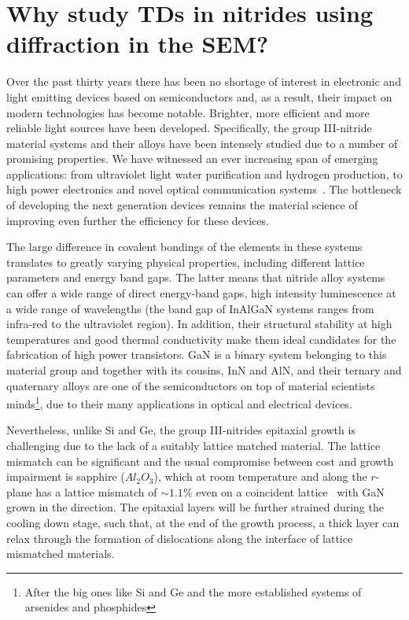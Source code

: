 \section{Why study TDs in nitrides using diffraction in the SEM?}
\label{sec:ECCITDmotivation}
Over the past thirty years there has been no shortage of interest in electronic and light emitting devices based on semiconductors and, as a result, their impact on modern technologies has become notable. Brighter, more efficient and more reliable light sources have been developed. Specifically, the group III-nitride material systems and their alloys have been intensely studied due to a number of promising properties. We have witnessed an ever increasing  span of emerging applications: from ultraviolet light water purification and hydrogen production, to high power electronics and novel optical communication systems~\cite{Kneissl10}. The bottleneck of developing the next generation devices remains the material science of improving even further the efficiency for these devices.

 The large difference in covalent bondings of the elements in these systems translates to greatly varying physical properties, including different lattice parameters and energy band gaps. The latter means that nitride alloy systems can offer a wide range of direct energy-band gaps, \ie high intensity luminescence at a wide range of wavelengths (\eg the band gap of InAlGaN systems ranges from infra-red to the ultraviolet region).  In addition, their structural stability at high temperatures and good thermal conductivity make them ideal candidates for the fabrication of high power transistors. GaN is a binary system belonging to this material group and together with its cousins, InN and AlN, and their ternary and quaternary alloys are one of the semiconductors on top of material scientists minds\footnote{After the big ones like Si and Ge and the more established systems of arsenides and phosphides}, due to their many applications in optical and electrical devices.  

Nevertheless, unlike Si and Ge, the group III-nitrides epitaxial growth is challenging due to the lack of a suitably lattice matched material. The lattice mismatch can be significant and the usual compromise between cost and growth impairment is sapphire ($Al_2O_3$), which at room temperature and along the $r$-plane has a lattice mismatch of $\sim1.1\%$ even on a coincident lattice~\cite{nitrides} with GaN grown in the \hkl[0001] direction. The epitaxial layers will be further strained during the cooling down stage, such that, at the end of the growth process, a thick layer can relax through the formation of dislocations along the interface of lattice mismatched materials.


